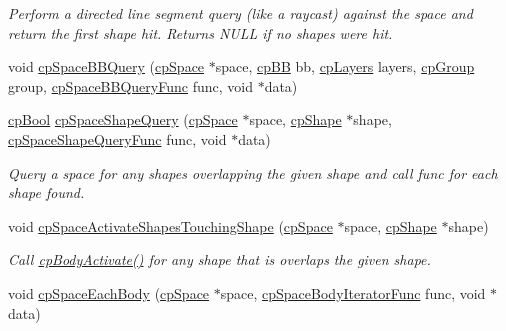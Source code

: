 \begin{DoxyCompactItemize}
\begin{DoxyCompactList}\small\item\em Perform a directed line segment query (like a raycast) against the space and return the first shape hit. Returns N\-U\-L\-L if no shapes were hit. \end{DoxyCompactList}\item 
void \hyperlink{group__cp_space_ga8cc12bf144da470f4ba42fe81f36b4e8}{cp\-Space\-B\-B\-Query} (\hyperlink{structcp_space}{cp\-Space} $\ast$space, \hyperlink{structcp_b_b}{cp\-B\-B} bb, \hyperlink{group__basic_types_ga5ec31e87ed3973cab80f9bfbbbcb43bb}{cp\-Layers} layers, \hyperlink{group__basic_types_gacd811b1135a8f4a3e5cc019552b18b1a}{cp\-Group} group, \hyperlink{group__cp_space_ga9f9d412c914ddec134554dde01dffbad}{cp\-Space\-B\-B\-Query\-Func} func, void $\ast$data)
\item 
\hypertarget{group__cp_space_ga8415bcc9318df0a7e50e1e2cc612ccd2}{\hyperlink{group__basic_types_gab6e5d8afee598a57cd323abae5310244}{cp\-Bool} \hyperlink{group__cp_space_ga8415bcc9318df0a7e50e1e2cc612ccd2}{cp\-Space\-Shape\-Query} (\hyperlink{structcp_space}{cp\-Space} $\ast$space, \hyperlink{structcp_shape}{cp\-Shape} $\ast$shape, \hyperlink{group__cp_space_gaef86eb47a5ac16c373eb8b59599d1806}{cp\-Space\-Shape\-Query\-Func} func, void $\ast$data)}\label{group__cp_space_ga8415bcc9318df0a7e50e1e2cc612ccd2}

\begin{DoxyCompactList}\small\item\em Query a space for any shapes overlapping the given shape and call {\ttfamily func} for each shape found. \end{DoxyCompactList}\item 
\hypertarget{group__cp_space_gad3e6bd83aa55c7ada13512c66c3740d3}{void \hyperlink{group__cp_space_gad3e6bd83aa55c7ada13512c66c3740d3}{cp\-Space\-Activate\-Shapes\-Touching\-Shape} (\hyperlink{structcp_space}{cp\-Space} $\ast$space, \hyperlink{structcp_shape}{cp\-Shape} $\ast$shape)}\label{group__cp_space_gad3e6bd83aa55c7ada13512c66c3740d3}

\begin{DoxyCompactList}\small\item\em Call \hyperlink{group__cp_body_ga9f6b2af6329a2b5c32712576719d357a}{cp\-Body\-Activate()} for any shape that is overlaps the given shape. \end{DoxyCompactList}\item 
\hypertarget{group__cp_space_gab526f8e9ea517058d4d90509e971120d}{void \hyperlink{group__cp_space_gab526f8e9ea517058d4d90509e971120d}{cp\-Space\-Each\-Body} (\hyperlink{structcp_space}{cp\-Space} $\ast$space, \hyperlink{group__cp_space_gac0cc4ac612fc81b31e3179b8a742570e}{cp\-Space\-Body\-Iterator\-Func} func, void $\ast$data)}\label{group__cp_space_gab526f8e9ea517058d4d90509e971120d}


\end{DoxyCompactItemize}
